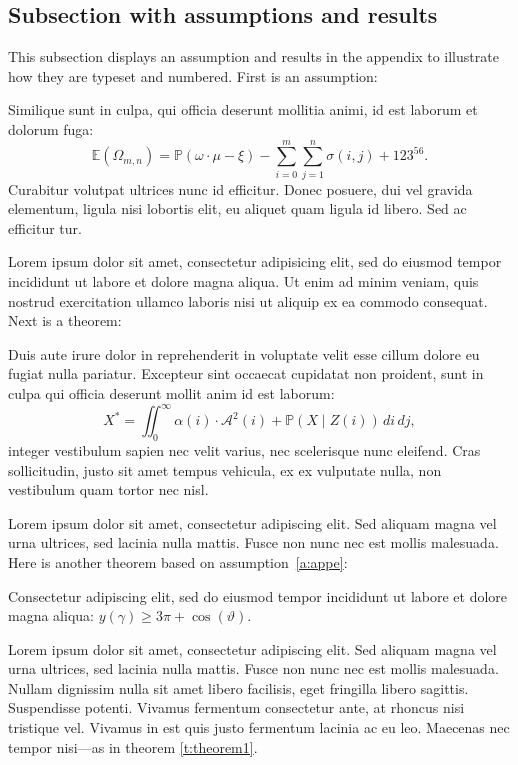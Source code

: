 \documentclass[letterpaper,11pt,leqno]{article}
\begin{document}
\subsection{Subsection with assumptions and results}

This subsection displays an assumption and results in the appendix to illustrate how they are typeset and numbered. First is an assumption:
\begin{assumption} 
Similique sunt in culpa, qui officia deserunt mollitia animi, id est laborum et dolorum fuga:
\begin{equation*}
\mathbb{E}(\Omega_{m,n}) = \mathbb{P}(\omega\cdot \mu - \xi) - \sum_{i=0}^{m}\sum_{j=1}^{n} \sigma(i,j) + 123^{56}.
\end{equation*}
Curabitur volutpat ultrices nunc id efficitur. Donec posuere, dui vel gravida elementum, ligula nisi lobortis elit, eu aliquet quam ligula id libero. Sed ac efficitur tur.
\label{a:appe}\end{assumption}

Lorem ipsum dolor sit amet, consectetur adipisicing elit, sed do eiusmod
tempor incididunt ut labore et dolore magna aliqua. Ut enim ad minim veniam,
quis nostrud exercitation ullamco laboris nisi ut aliquip ex ea commodo
consequat. Next is a theorem:
\begin{theorem}
Duis aute irure dolor in reprehenderit in voluptate velit esse
cillum dolore eu fugiat nulla pariatur. Excepteur sint occaecat cupidatat non
proident, sunt in culpa qui officia deserunt mollit anim id est laborum:
\begin{equation}
X^* =\iint_{0}^{\infty} \alpha(i) \cdot \mathcal{A}^2(i) + \mathbb{P}(X\mid Z(i))\,di\,dj,\end{equation}
integer vestibulum sapien nec velit varius, nec scelerisque nunc eleifend. Cras sollicitudin, justo sit amet tempus vehicula, ex ex vulputate nulla, non vestibulum quam tortor nec nisl. 
\end{theorem}

Lorem ipsum dolor sit amet, consectetur adipiscing elit. Sed aliquam magna vel urna ultrices, sed lacinia nulla mattis. Fusce non nunc nec est mollis malesuada. Here is another theorem based on assumption~\ref{a:appe}:
\begin{theorem}
Consectetur adipiscing elit, sed do eiusmod tempor incididunt ut labore et dolore magna aliqua: $y(\gamma) \geq 3\pi + \cos(\vartheta)$.
\label{t:theorem1}\end{theorem}

Lorem ipsum dolor sit amet, consectetur adipiscing elit. Sed aliquam magna vel urna ultrices, sed lacinia nulla mattis. Fusce non nunc nec est mollis malesuada. Nullam dignissim nulla sit amet libero facilisis, eget fringilla libero sagittis. Suspendisse potenti. Vivamus fermentum consectetur ante, at rhoncus nisi tristique vel. Vivamus in est quis justo fermentum lacinia ac eu leo. Maecenas nec tempor nisi---as in theorem \ref{t:theorem1}.
\end{document}
